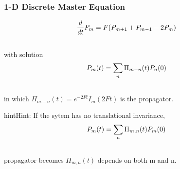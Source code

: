 \documentclass[letterpaper,10pt,english]{sphinxmanual}
\begin{document}
\subsubsection{1-D Discrete Master Equation}
\label{nonequilibrium/week11:d-discrete-master-equation}\begin{gather}
\begin{split}\frac{d}{dt}P_m= F(P_{m+1} + P_{m-1} -2 P_m)\end{split}\notag\\\begin{split}\end{split}\notag
\end{gather}
with solution
\begin{gather}
\begin{split}P_m(t) = \sum_n \Pi_{m-n}(t) P_n(0)\end{split}\notag\\\begin{split}\end{split}\notag
\end{gather}
in which $\Pi_{m-n}(t) = e^{-2Ft}I_m(2Ft)$ is the propagator.

\begin{notice}{hint}{Hint:}
If the sytem has no translational invariance,
\begin{gather}
\begin{split}P_m(t) = \sum_n \Pi_{m,n}(t) P_m(0)\end{split}\notag\\\begin{split}\end{split}\notag
\end{gather}
propagator becomes $\Pi_{m,n}(t)$ depends on both m and n.
\end{notice}
\end{document}
